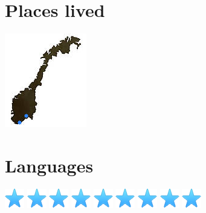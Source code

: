 \documentclass[]{cv-class}
\begin{document}
\newpage
\begin{aside}
  \section{Places lived}
    \includegraphics[scale=0.62]{img/norway.png}
    ~
  \section{Languages}
    {\includegraphics[scale=0.30]{img/star.png}
    \includegraphics[scale=0.30]{img/star.png}
    \includegraphics[scale=0.30]{img/star.png}
    \includegraphics[scale=0.30]{img/star.png}
    \includegraphics[scale=0.30]{img/star.png}}
    {\includegraphics[scale=0.30]{img/star.png}
    \includegraphics[scale=0.30]{img/star.png}
    \includegraphics[scale=0.30]{img/star.png}
    \includegraphics[scale=0.30]{img/star.png}
}
\end{aside}
\end{document}
